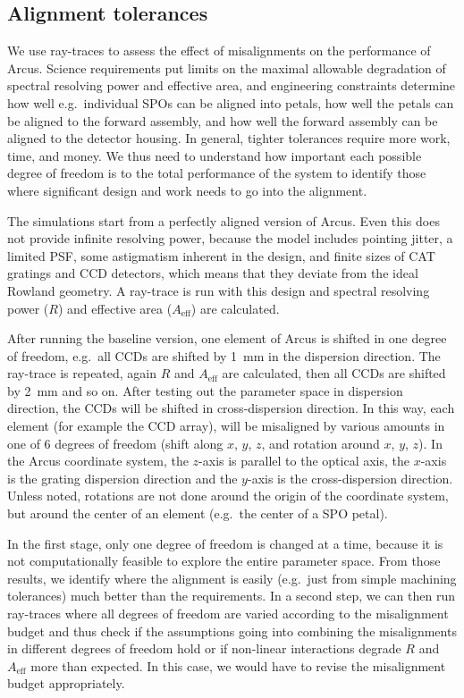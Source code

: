 \documentclass[12pt]{spieman}  %
\begin{document}
\begin{spacing}{1}
\section{Alignment tolerances}
We use ray-traces to assess the effect of misalignments on the performance of Arcus. Science requirements put limits on the maximal allowable degradation of spectral resolving power and effective area, and engineering constraints determine how well e.g.\ individual SPOs can be aligned into petals, how well the petals can be aligned to the forward assembly, and how well the forward assembly can be aligned to the detector housing. In general, tighter tolerances require more work, time, and money. We thus need to understand how important each possible degree of freedom is to the total performance of the system to identify those where significant design and work needs to go into the alignment.

The simulations start from a perfectly aligned version of Arcus. Even this does not provide infinite resolving power, because the model includes pointing jitter, a limited PSF, some astigmatism inherent in the design, and finite sizes of CAT gratings and CCD detectors, which means that they deviate from the ideal Rowland geometry. A ray-trace is run with this design and spectral resolving power ($R$) and effective area ($A_\mathrm{eff}$) are calculated.

After running the baseline version, one element of Arcus is shifted in one degree of freedom, e.g.\ all CCDs are shifted by 1~mm in the dispersion direction. The ray-trace is repeated, again $R$ and $A_\mathrm{eff}$ are calculated, then all CCDs are shifted by 2~mm and so on. After testing out the parameter space in dispersion direction, the CCDs will be shifted in cross-dispersion direction. In this way, each element (for example the CCD array), will be misaligned by various amounts in one of 6 degrees of freedom (shift along $x$, $y$, $z$, and rotation around $x$, $y$, $z$).
In the Arcus coordinate system, the $z$-axis is parallel to the optical axis, the $x$-axis is the grating dispersion direction and the $y$-axis is the cross-dispersion direction. Unless noted, rotations are not done around the origin of the coordinate system, but around the center of an element (e.g.\ the center of a SPO petal).

In the first stage, only one degree of freedom is changed at a time, because it is not computationally feasible to explore the entire parameter space. From those results, we identify where the alignment is easily (e.g.\ just from simple machining tolerances) much better than the requirements. In a second step, we can then run ray-traces where all degrees of freedom are varied according to the misalignment budget and thus check if the assumptions going into combining the misalignments in different degrees of freedom hold or if non-linear interactions degrade $R$ and $A_\mathrm{eff}$ more than expected. In this case, we would have to revise the misalignment budget appropriately.


\end{spacing}
\end{document}

